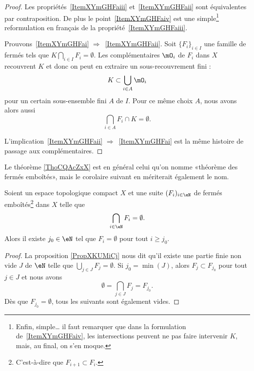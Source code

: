 \begin{proof}
	Les propriétés~\ref{ItemXYmGHFaiii} et~\ref{ItemXYmGHFaii} sont équivalentes par contraposition. De plus le point~\ref{ItemXYmGHFaiv} est une simple\footnote{Enfin, simple\dots{} il faut remarquer que dans la formulation de~\ref{ItemXYmGHFaiv}, les intersections peuvent ne pas faire intervenir \( K \), mais, au final, on s'en moque.} reformulation en français de la propriété~\ref{ItemXYmGHFaiii}.

	Prouvons~\ref{ItemXYmGHFai} \( \Rightarrow\)~\ref{ItemXYmGHFaii}. Soit \( \{ F_i \}_{i\in I}\) une famille de fermés tels que \( K\bigcap_{i\in I}F_i=\emptyset\). Les complémentaires \( \mO_i\) de \( F_i\) dans \( X\) recouvrent \( K\) et donc on peut en extraire un sous-recouvrement fini :
	\begin{equation}
		K\subset\bigcup_{i\in A}\mO_i
	\end{equation}
	pour un certain sous-ensemble fini \( A\) de \( I\). Pour ce même choix \( A\), nous avons alors aussi
	\begin{equation}
		\bigcap_{i\in A}F_i \cap K =\emptyset.
	\end{equation}

	L'implication~\ref{ItemXYmGHFaii} \( \Rightarrow\)~\ref{ItemXYmGHFai} est la même histoire de passage aux complémentaires.
\end{proof}

Le théorème \ref{ThoCQAcZxX} est en général celui qu'on nomme «théorème des fermés emboîtés», mais le corolaire suivant en mériterait également le nom.
\begin{corollary}       \label{CORooQABLooMPSUBf}
	Soient un espace topologique compact \( X\) et une suite \( (F_i)_{i\in \eN}\) de fermés emboîtés\footnote{C'est-à-dire que \( F_{i+1}\subset F_i\).} dans \( X\) telle que
	\begin{equation}
		\bigcap_{i\in \eN}F_i=\emptyset.
	\end{equation}
	Alors il existe \( j_0\in \eN\) tel que \( F_i=\emptyset\) pour tout \( i\geq j_0\).
\end{corollary}

\begin{proof}
	La proposition \ref{PropXKUMiCj} nous dit qu'il existe une partie finie non vide \( J\) de \( \eN\) telle que \( \bigcup_{j\in J}F_j=\emptyset\). Si \( j_0=\min(J)\), alors \( F_j\subset F_{j_0}\) pour tout \( j\in J\) et nous avons
	\begin{equation}
		\emptyset=\bigcap_{j\in J}F_j=F_{j_0}.
	\end{equation}
	Dès que \( F_{j_0}=\emptyset\), tous les suivants sont également vides.
\end{proof}

